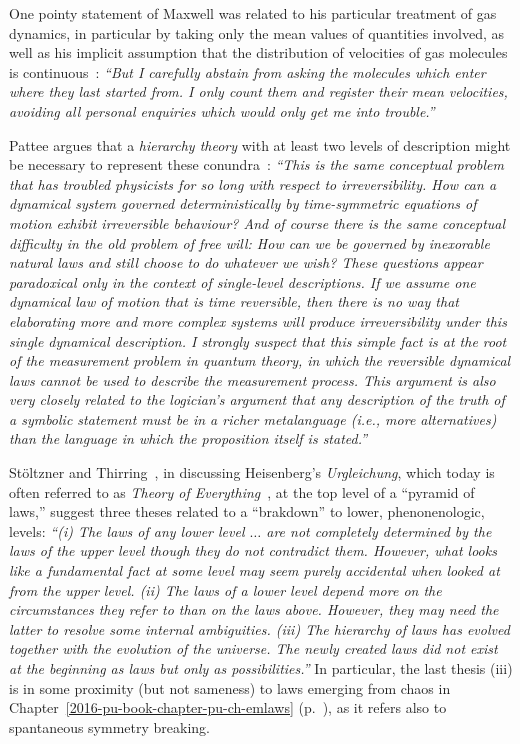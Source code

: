 One pointy statement of Maxwell was related to his particular treatment of gas dynamics, in particular
by taking only the mean values of quantities involved, as well as
his implicit assumption that the distribution of velocities of gas molecules is continuous~\cite[p.~422]{garber}:
{\em ``But I carefully abstain from asking the
molecules which enter where they last started from. I only count them and
register their mean velocities, avoiding all personal enquiries which would
only get me into trouble.''}

Pattee argues that a
{\em hierarchy theory}
with at least two levels of description might be necessary to represent these conundra~\cite[p.~117]{Pattee2012}:
\label{2016-pu-book-chapter-eo-pattee}
{\em ``This is the same conceptual problem that has troubled physicists for so long with
respect to irreversibility. How can a dynamical system governed deterministically
by time-symmetric equations of motion exhibit irreversible behaviour? And of course
there is the same conceptual difficulty in the old problem of free will: How can we
be governed by inexorable natural laws and still choose to do whatever we wish?
These questions appear paradoxical only in the context of single-level descriptions.
If we assume one dynamical law of motion that is time reversible, then there is no
way that elaborating more and more complex systems will produce irreversibility
under this single dynamical description. I strongly suspect that this simple fact is at
the root of the measurement problem in quantum theory, in which the reversible
dynamical laws cannot be used to describe the measurement process.
This argument is also very closely related to
the logician's argument that any description of the truth of a symbolic statement
must be in a richer metalanguage (i.e., more alternatives) than the language in which
the proposition itself is stated.''}

St\"oltzner and Thirring~\cite{stoeltzner-Thirring-94,Stoeltzner-1995,thirring-97},
in discussing Heisenberg's {\it Urgleichung}, which today is often referred to as {\em Theory of Everything}~\cite{barrow-TOE},
at the top level of a ``pyramid of laws,''
suggest three theses related to a ``brakdown'' to lower, phenonenologic, levels:
{\em ``(i) The laws of any lower level $\ldots$ are not
completely determined by the laws of the upper level though they do not
contradict them. However, what looks like a fundamental fact at some
level may seem purely accidental when looked at from the upper level.
(ii) The laws of a lower level depend more on the circumstances they refer
to than on the laws above. However, they may need the latter to resolve
some internal ambiguities.
(iii) The hierarchy of laws has evolved together with the evolution of the
universe. The newly created laws did not exist at the beginning as laws
but only as possibilities.''}
In particular, the last thesis (iii) is in some proximity (but not sameness) to laws emerging from chaos in Chapter~\ref{2016-pu-book-chapter-pu-ch-emlaws}
(p.~\pageref{2016-pu-book-chapter-pu-ch-emlaws}), as it refers also to spantaneous symmetry breaking.

